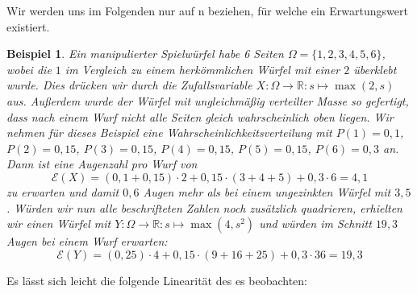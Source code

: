 \documentclass[a4paper]{article}
\newtheorem{beispiel}[satz]{Beispiel}
\theoremstyle{nonumberplain}
\begin{document}
Wir werden uns im Folgenden nur auf \rvar n beziehen, für welche ein Erwartungswert existiert.
\begin{beispiel}\label{example-expect}
	Ein manipulierter Spielwürfel habe 6 Seiten $\Omega = \{1,2,3,4,5,6\}$, wobei die $1$ im Vergleich zu einem herkömmlichen Würfel mit einer $2$ überklebt wurde. Dies drücken wir durch die Zufallsvariable $X : \Omega \to \mathbb{R} : s \mapsto \max(2,s)$ aus. Außerdem wurde der Würfel mit ungleichmäßig verteilter Masse so gefertigt, dass nach einem Wurf nicht alle Seiten gleich wahrscheinlich oben liegen. Wir nehmen für dieses Beispiel eine Wahrscheinlichkeitsverteilung mit $P(1)=0,1$, $P(2)=0,15$, $P(3)=0,15$, $P(4)=0,15$, $P(5)=0,15$, $P(6)=0,3$ an.
	Dann ist eine Augenzahl pro Wurf von
	\[
	\mathcal{E}(X) = (0,1 + 0,15) \cdot 2 + 0,15 \cdot (3 + 4 + 5) + 0,3 \cdot 6 = 4,1
	\]
	zu erwarten und damit $0,6$ Augen mehr als bei einem ungezinkten Würfel mit \expect{} $3,5$. Würden wir nun alle beschrifteten Zahlen noch zusätzlich quadrieren, erhielten wir einen Würfel mit $Y : \Omega \to \mathbb{R} : s \mapsto \max(4, s^2)$ und würden im Schnitt $19,3$ Augen bei einem Wurf erwarten:
	\[
	\mathcal{E}(Y) = (0,25) \cdot 4 + 0,15 \cdot (9 + 16 + 25) + 0,3 \cdot 36 = 19,3
	\]
\end{beispiel}

Es lässt sich leicht die folgende Linearität des \expect{}es beobachten:
\end{document}
